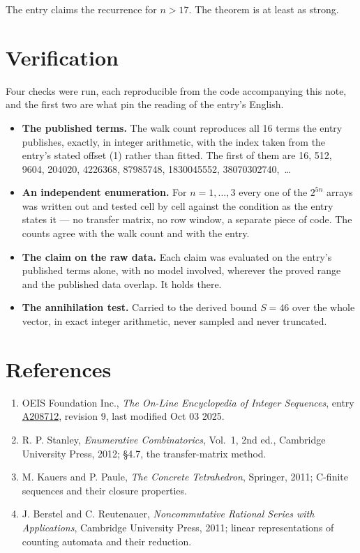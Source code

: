 \documentclass[11pt]{article}
\theoremstyle{definition}
\begin{document}
The entry claims the recurrence for $n > 17$. The theorem is at least as strong.

\section{Verification}

Four checks were run, each reproducible from the code accompanying this note, and the first two are what pin the reading of the entry's English.

\begin{itemize}

\item {\bfseries The published terms.} The walk count reproduces all 16 terms the entry publishes, exactly, in integer arithmetic, with the index taken from the entry's stated offset (1) rather than fitted. The first of them are 16, 512, 9604, 204020, 4226368, 87985748, 1830045552, 38070302740,~\dots

\item {\bfseries An independent enumeration.} For $n = 1,\dots,3$ every one of the $2^{5n}$ arrays was written out and tested cell by cell against the condition as the entry states it --- no transfer matrix, no row window, a separate piece of code. The counts agree with the walk count and with the entry.

\item {\bfseries The claim on the raw data.} Each claim was evaluated on the entry's published terms alone, with no model involved, wherever the proved range and the published data overlap. It holds there.

\item {\bfseries The annihilation test.} Carried to the derived bound $S = 46$ over the whole vector, in exact integer arithmetic, never sampled and never truncated.

\end{itemize}

\section{References}

\begin{enumerate}

\item OEIS Foundation Inc., \emph{The On-Line Encyclopedia of Integer Sequences}, entry \href{https://oeis.org/A208712}{A208712}, revision 9, last modified Oct 03 2025.

\item R. P. Stanley, \emph{Enumerative Combinatorics}, Vol.~1, 2nd ed., Cambridge University Press, 2012; \S4.7, the transfer-matrix method.

\item M. Kauers and P. Paule, \emph{The Concrete Tetrahedron}, Springer, 2011; C-finite sequences and their closure properties.

\item J. Berstel and C. Reutenauer, \emph{Noncommutative Rational Series with Applications}, Cambridge University Press, 2011; linear representations of counting automata and their reduction.

\end{enumerate}
\end{document}
